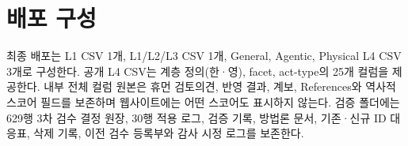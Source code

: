 \documentclass[11pt,a4paper]{article}
\begin{document}
\par\section{배포 구성}
최종 배포는 L1 CSV 1개, L1/L2/L3 CSV 1개, General, Agentic, Physical L4 CSV 3개로 구성한다. 공개 L4 CSV는 계층 정의(한·영), facet, act-type의 25개 컬럼을 제공한다. 내부 전체 컬럼 원본은 휴먼 검토의견, 반영 결과, 계보, References와 역사적 스코어 필드를 보존하며 웹사이트에는 어떤 스코어도 표시하지 않는다. 검증 폴더에는 629행 3차 검수 결정 원장, 30행 적용 로그, 검증 기록, 방법론 문서, 기존·신규 ID 대응표, 삭제 기록, 이전 검수 등록부와 감사 시정 로그를 보존한다.
\end{document}
